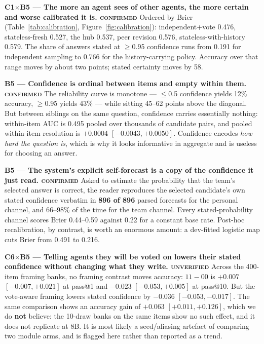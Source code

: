 \documentclass[10pt,a4paper]{article}
\newcommand{\ax}[1]{\textcolor{accent}{\textbf{#1}}}
\newcommand{\bx}[1]{\textcolor{warm}{\textbf{#1}}}
\newcommand{\trend}[1]{\medskip\noindent\textbf{#1}\quad}
\begin{document}
\trend{\ax{C1}$\times$\bx{B5} --- The more an agent sees of other agents, the more certain and worse calibrated it is. \textsc{confirmed}}
Ordered by Brier (Table~\ref{tab:calibration}, Figure~\ref{fig:calibration}): independent+vote 0.476, stateless-fresh 0.527, the hub 0.537, peer revision 0.576, stateless-with-history 0.579. The share of answers stated at $\ge$0.95 confidence runs from 0.191 for independent sampling to 0.766 for the history-carrying policy. Accuracy over that range moves by about two points; stated certainty moves by 58.

\trend{\bx{B5} --- Confidence is ordinal between items and empty within them. \textsc{confirmed}}
The reliability curve is monotone --- $\le$0.5 confidence yields 12\% accuracy, $\ge$0.95 yields 43\% --- while sitting 45--62 points above the diagonal. But between siblings on the same question, confidence carries essentially nothing: within-item AUC is 0.495 pooled over thousands of candidate pairs, and pooled within-item resolution is $+0.0004$ $[-0.0043,+0.0050]$. Confidence encodes \emph{how hard the question is}, which is why it looks informative in aggregate and is useless for choosing an answer.

\trend{\bx{B5} --- The system's explicit self-forecast is a copy of the confidence it just read. \textsc{confirmed}}
Asked to estimate the probability that the team's selected answer is correct, the reader reproduces the selected candidate's own stated confidence verbatim in \textbf{896 of 896} parsed forecasts for the personal channel, and 66--98\% of the time for the team channel. Every stated-probability channel scores Brier 0.44--0.59 against 0.22 for a constant base rate. Post-hoc recalibration, by contrast, is worth an enormous amount: a dev-fitted logistic map cuts Brier from 0.491 to 0.216.

\trend{\ax{C6}$\times$\bx{B5} --- Telling agents they will be voted on lowers their stated confidence without changing what they write. \textsc{unverified}}
Across the 400-item framing banks, no framing contrast moves accuracy: $11-00$ is $+0.007$ $[-0.007,+0.021]$ at pass@1 and $-0.023$ $[-0.053,+0.005]$ at pass@10. But the vote-aware framing lowers stated confidence by $-0.036$ $[-0.053,-0.017]$. The same comparison shows an accuracy gain of $+0.063$ $[+0.011,+0.126]$, which we do \textbf{not} believe: the 10-draw banks on the same items show no such effect, and it does not replicate at 8B. It is most likely a seed/aliasing artefact of comparing two module arms, and is flagged here rather than reported as a trend.
\end{document}
